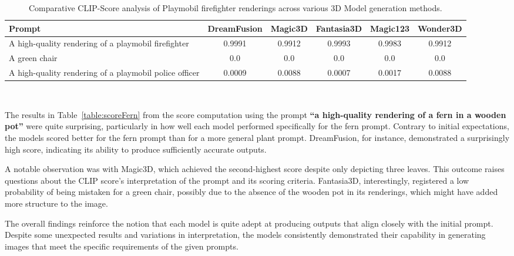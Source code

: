 \begin{table}[htbp]
    \centering
    \small
    \begin{tabular}{m{4cm}S[table-format=1.2]S[table-format=1.2]S[table-format=1.2]S[table-format=1.2]S[table-format=1.2]}
    \toprule
    {Prompt} & {DreamFusion} & {Magic3D} & {Fantasia3D} & {Magic123} & {Wonder3D} \\
    \midrule
    A high-quality rendering of a playmobil firefighter & 0.9991 & 0.9912 & 0.9993 & 0.9983 & 0.9912 \\
    \midrule
    A green chair & 0.0 & 0.0 & 0.0 & 0.0 & 0.0 \\
    \midrule
    A high-quality rendering of a playmobil police officer & 0.0009 & 0.0088 & 0.0007 & 0.0017 & 0.0088 \\
    \bottomrule 
    \end{tabular}
    \caption{Comparative CLIP-Score analysis of Playmobil firefighter renderings across various 3D Model generation methods.}~\label{table:scorePlaymobil}
\end{table}

The results in Table~\ref{table:scoreFern} from the score computation using the prompt \textbf{``a high-quality rendering of a fern in a wooden pot''} were quite surprising, particularly in how well each model performed specifically for the fern prompt. Contrary to initial expectations, the models scored better for the fern prompt than for a more general plant prompt. DreamFusion, for instance, demonstrated a surprisingly high score, indicating its ability to produce sufficiently accurate outputs.

A notable observation was with Magic3D, which achieved the second-highest score despite only depicting three leaves. This outcome raises questions about the CLIP score's interpretation of the prompt and its scoring criteria. Fantasia3D, interestingly, registered a low probability of being mistaken for a green chair, possibly due to the absence of the wooden pot in its renderings, which might have added more structure to the image.

The overall findings reinforce the notion that each model is quite adept at producing outputs that align closely with the initial prompt. Despite some unexpected results and variations in interpretation, the models consistently demonstrated their capability in generating images that meet the specific requirements of the given prompts.

